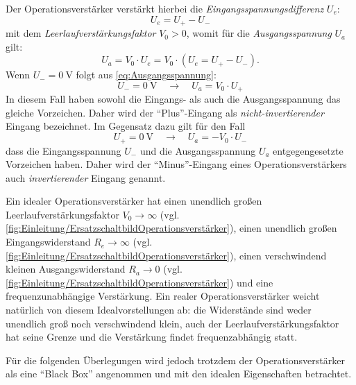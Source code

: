 Der Operationsverstärker verstärkt hierbei die 
\textsl{Eingangsspannungsdifferenz} $U_e$:
\begin{equation}\label{eq:Eingangsspannungsdifferenz}
	U_e = U_+ - U_-
\end{equation}
mit dem \textsl{Leerlaufverstärkungsfaktor} $V_0 > 0$, womit für die 
\textsl{Ausgangsspannung} $U_a$ gilt:
\begin{equation}\label{eq:Ausgangsspannung}
	U_a = V_0 \cdot U_e = V_0 \cdot \left(U_e = U_+ - U_-\right).
\end{equation}
Wenn $U_- = \qty{0}{\V}$ folgt aus \cref{eq:Ausgangsspannung}:
\begin{equation}
	U_- = \qty{0}{\V} \quad \rightarrow \quad U_a = V_0 \cdot U_+
\end{equation}
In diesem Fall haben sowohl die Eingangs- als auch die Ausgangsspannung das 
gleiche Vorzeichen. Daher wird der "`Plus"'-Eingang als 
\textsl{nicht-invertierender} Eingang bezeichnet. Im Gegensatz dazu gilt für 
den Fall
\begin{equation}
	U_+ = \qty{0}{\V} \quad \rightarrow \quad U_a = -V_0 \cdot U_-
\end{equation}
dass die Eingangsspannung $U_-$ und die Ausgangsspannung $U_a$ entgegengesetzte 
Vorzeichen haben. Daher wird der "`Minus"'-Eingang eines Operationsverstärkers 
auch \textsl{invertierender} Eingang genannt.

Ein idealer Operationsverstärker hat einen unendlich großen 
Leerlaufverstärkungsfaktor $V_0 \rightarrow \infty$ (vgl. 
\cref{fig:Einleitung/ErsatzschaltbildOperationsverstärker}), einen unendlich 
großen 
Eingangswiderstand $R_e \rightarrow \infty$ (vgl. 
\cref{fig:Einleitung/ErsatzschaltbildOperationsverstärker}), einen 
verschwindend kleinen Ausgangswiderstand $R_a \rightarrow 0$ (vgl. 
\cref{fig:Einleitung/ErsatzschaltbildOperationsverstärker}) und eine 
frequenzunabhängige Verstärkung. Ein realer Operationsverstärker weicht 
natürlich von diesem Idealvorstellungen ab: die Widerstände sind weder 
unendlich groß noch verschwindend klein, auch der Leerlaufverstärkungsfaktor 
hat seine Grenze und die Verstärkung findet frequenzabhängig statt.

Für die folgenden Überlegungen wird jedoch trotzdem der Operationsverstärker 
als eine "`Black Box"' angenommen und mit den idealen Eigenschaften betrachtet.
